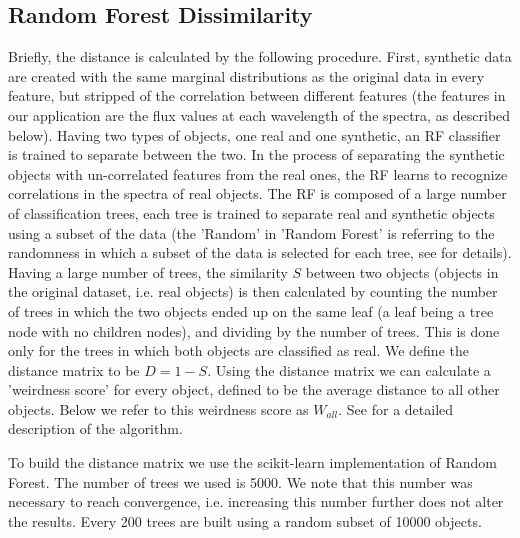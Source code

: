 \documentclass[fleqn,usenatbib]{mnras}
\begin{document}
\subsection{Random Forest Dissimilarity}
Briefly, the distance is calculated by the following procedure. First, synthetic data are created with the same marginal distributions as the original data in every feature, but stripped of the correlation between different features (the features in our application are the flux values at each wavelength of the spectra, as described below). Having two types of objects, one real and one synthetic, an RF classifier is trained to separate between the two. In the process of separating the synthetic objects with un-correlated features from the real ones, the RF learns to recognize correlations in the spectra of real objects. The RF is composed of a large number of classification trees, each tree is trained to separate real and synthetic objects using a subset of the data (the 'Random' in 'Random Forest' is referring to the randomness in which a subset of the data is selected for each tree, see \citet{breiman84,breiman01} for details). Having a large number of trees, the similarity $S$ between two objects (objects in the original dataset, i.e. real objects) is then calculated by counting the number of trees in which the two objects ended up on the same leaf (a leaf being a tree node with no children nodes), and dividing by the number of trees. This is done only for the trees in which both objects are classified as real. 
We define the distance matrix to be $D = 1 - S$. Using the distance matrix we can calculate a 'weirdness score' for every object, defined to be the average distance to all other objects. Below we refer to this weirdness score as $W_{all}$. See \citet{baron17a} for a detailed description of the algorithm. 

To build the distance matrix we use the scikit-learn implementation of Random Forest. The number of trees we used is 5000. We note that this number was necessary to reach convergence, i.e. increasing this number further does not alter the results. Every 200 trees are built using a random subset of 10000 objects.
\end{document}
